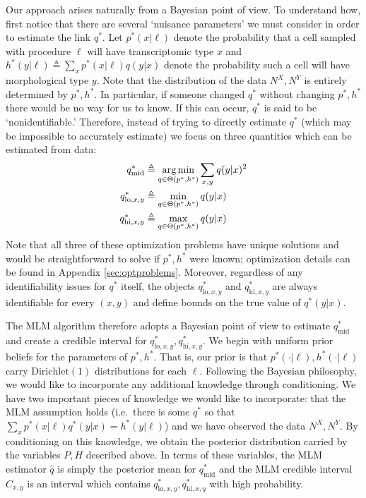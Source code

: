 Our approach arises naturally from a Bayesian point of view.  To understand how, first notice that there are several `nuisance parameters' we must consider in order to estimate the link $q^*$.  Let $p^*(x|\ell)$ denote the probability that a cell sampled with procedure $\ell$ will have transcriptomic type $x$ and $h^*(y|\ell) \triangleq \sum_x p^*(x|\ell)q(y|x)$ denote the probability such a cell will have morphological type $y$.  Note that the distribution of the data $N^X,N^Y$ is entirely determined by $p^*,h^*$.   In particular, if someone changed $q^*$ without changing $p^*,h^*$ there would be no way for us to know.  If this can occur, $q^*$ is said to be `nonidentifiable.'   Therefore, instead of trying to directly estimate $q^*$ (which may be impossible to accurately estimate) we focus on three quantities which can be estimated from data:
%
\begin{align*}
q^*_{\mathrm{mid}} &\triangleq \operatorname*{arg\,min}_{q\in \Theta(p^*,h^*)} \sum_{x,y} q(y|x)^2\\
q^*_{\mathrm{lo},x,y} &\triangleq \min_{q\in \Theta(p^*,h^*)} q(y|x) \\
q^*_{\mathrm{hi},x,y} &\triangleq \max_{q\in \Theta(p^*,h^*)} q(y|x) 
\end{align*}
%
Note that all three of these optimization problems have unique solutions and would be straightforward to solve if $p^*,h^*$ were known; optimization details can be found in Appendix \ref{sec:optproblems}.  Moreover, regardless of any identifiability issues for $q^*$ itself, the objects $q^*_{\mathrm{lo},x,y}$ and $q^*_{\mathrm{hi},x,y}$ are always identifiable for every $(x,y)$ and define bounds on the true value of $q^*(y|x)$.

The MLM algorithm therefore adopts a Bayesian point of view to estimate $q^*_{\mathrm{mid}}$ and create a credible interval for $q^*_{\mathrm{lo},x,y},q^*_{\mathrm{hi},x,y}$.  We begin with uniform prior beliefs for the parameters of $p^*,h^*$.  That is, our prior is that $p^*(\cdot|\ell),h^*(\cdot|\ell)$ carry $\mathrm{Dirichlet}(1)$ distributions for each $\ell$.  Following the Bayesian philosophy, we would like to incorporate any additional knowledge through conditioning.  We have two important pieces of knowledge we would like to incorporate: that the MLM assumption holds (i.e.\ there is some $q^*$ so that $\sum_x p^*(x|\ell)q^*(y|x)=h^*(y|\ell)$) and we have observed the data $N^X,N^Y$.  By conditioning on this knowledge, we obtain the posterior distribution carried by the variables $P,H$ described above.  In terms of these variables, the MLM estimator $\hat q$ is simply the posterior mean for $q^*_{\mathrm{mid}}$ and the MLM credible interval $C_{x,y}$ is an interval which contains $q^*_{\mathrm{lo},x,y},q^*_{\mathrm{hi},x,y}$ with high probability.  

